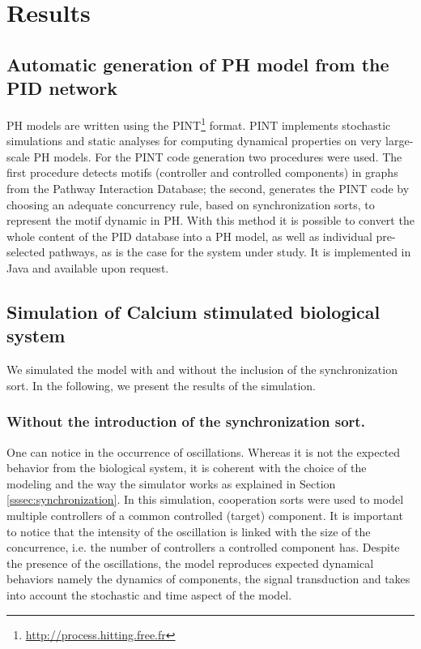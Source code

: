 \section{Results}
\subsection{Automatic generation of PH model from the PID network}
PH models are written using the PINT\footnote{\url{http://process.hitting.free.fr}} format.  
PINT implements stochastic simulations and static analyses for computing dynamical properties on very large-scale PH models.
For the PINT code generation two procedures were used.
The first procedure detects motifs (controller and controlled components) in graphs from the Pathway Interaction Database; the second, 
generates the PINT code by choosing an adequate concurrency rule, based on synchronization sorts, to represent the motif dynamic in PH.
With this method it is possible to convert the whole content of the PID database into a PH model, as well as individual pre-selected pathways, 
as is the case for the system under study.  It is implemented in Java and available upon request.

\subsection{Simulation of Calcium stimulated biological system}
We simulated the model with and without the inclusion of the synchronization sort. In the following, we present the results of 
the simulation.

\subsubsection{Without the introduction of the synchronization sort.}
One can notice in  the occurrence of oscillations. Whereas it is not the expected behavior from the biological system,
 it is coherent with the choice of the modeling and the way the simulator works as explained in Section \ref{sssec:synchronization}.
In this simulation, cooperation sorts were used to model multiple controllers of a common controlled (target) component.
It is important to notice that the intensity of the oscillation is linked with 
the size of the concurrence, i.e. the number of controllers a controlled component has.
Despite the presence of the oscillations, the model reproduces expected dynamical behaviors  namely
the dynamics of components, the signal transduction and takes into account the stochastic and time aspect of the model.

